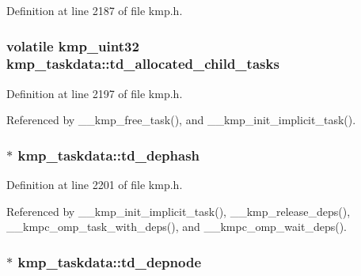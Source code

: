 Definition at line 2187 of file kmp.\-h.

\hypertarget{structkmp__taskdata_a56dce087baa8fa613d288f54e5e26bdb}{
\subsubsection[{td\-\_\-allocated\-\_\-child\-\_\-tasks}]{\setlength{\rightskip}{0pt plus 5cm}volatile kmp\-\_\-uint32 kmp\-\_\-taskdata\-::td\-\_\-allocated\-\_\-child\-\_\-tasks}}\label{structkmp__taskdata_a56dce087baa8fa613d288f54e5e26bdb}


Definition at line 2197 of file kmp.\-h.



Referenced by \-\_\-\-\_\-kmp\-\_\-free\-\_\-task(), and \-\_\-\-\_\-kmp\-\_\-init\-\_\-implicit\-\_\-task().

\hypertarget{structkmp__taskdata_a428a82593aa88b9d2420390cdee239d8}{
\subsubsection[{td\-\_\-dephash}]{$\ast$ kmp\-\_\-taskdata\-::td\-\_\-dephash}}\label{structkmp__taskdata_a428a82593aa88b9d2420390cdee239d8}


Definition at line 2201 of file kmp.\-h.



Referenced by \-\_\-\-\_\-kmp\-\_\-init\-\_\-implicit\-\_\-task(), \-\_\-\-\_\-kmp\-\_\-release\-\_\-deps(), \-\_\-\-\_\-kmpc\-\_\-omp\-\_\-task\-\_\-with\-\_\-deps(), and \-\_\-\-\_\-kmpc\-\_\-omp\-\_\-wait\-\_\-deps().

\hypertarget{structkmp__taskdata_a877878bd557ba3bdc7749e531cb845b3}{
\subsubsection[{td\-\_\-depnode}]{$\ast$ kmp\-\_\-taskdata\-::td\-\_\-depnode}}\label{structkmp__taskdata_a877878bd557ba3bdc7749e531cb845b3}


